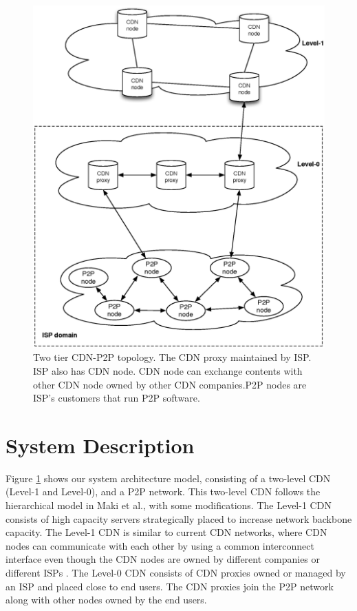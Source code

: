 \documentclass[paper]{ieice}
\begin{document}
\begin{figure}[hb]
\begin{center}
\includegraphics[scale=0.4]{graphs/two-tier-cdn-topology.eps}
\end{center}
\caption{Two tier CDN-P2P topology.
The CDN proxy maintained by ISP. ISP also has CDN node. CDN node can exchange contents with other CDN node owned by other CDN companies.P2P nodes are ISP's customers that run P2P software.}
\label{fig:twotier}
\vspace{-2mm}
\end{figure} 


 
\section{System Description}\label{description}

Figure \ref{fig:twotier} shows our system architecture model,
consisting of a two-level CDN (Level-1 and Level-0), and a P2P network.
This two-level CDN follows the hierarchical model in Maki et
al.\cite{NaoyaMAKI2012}, with some modifications.
The Level-1 CDN consists of high capacity servers strategically placed to increase network backbone capacity.
The Level-1 CDN is similar to current CDN networks, where CDN nodes
can communicate with each other by using a common interconnect interface even though the CDN nodes are owned by different companies or different ISPs \cite{cdni}.
The Level-0 CDN consists of CDN proxies owned or managed by an ISP and placed close to end users.
The CDN proxies join the P2P network along with other nodes owned by the end users.
\end{document}
